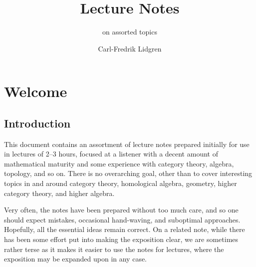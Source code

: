 \documentclass[a4paper, 11pt]{article}
\title{Lecture Notes}
\author{on assorted topics}
\date{Carl-Fredrik Lidgren}
\newcommand{\1}{\ensuremath{\mathbb{1}}}
\newcommand{\2}{\ensuremath{\mathbb{2}}}
\newcommand{\3}{\ensuremath{\mathbb{3}}}
\begin{document}
\maketitle


\tableofcontents

\clearpage
\setcounter{section}{-1}
\section{Welcome}
\subsection{Introduction}
This document contains an assortment of lecture notes prepared initially for use in lectures of 2--3 hours, focused at a listener with a decent amount of mathematical
maturity and some experience with category theory, algebra, topology, and so on. There is no overarching goal, other than to cover interesting topics in and around category
theory, homological algebra, geometry, higher category theory, and higher algebra.

Very often, the notes have been prepared without too much care, and so one should expect mistakes, occasional hand-waving, and suboptimal approaches. Hopefully, all the essential ideas
remain correct. On a related note, while there has been some effort put into making the exposition clear, we are sometimes rather terse as it makes it easier to use the notes
for lectures, where the exposition may be expanded upon in any case.
\end{document}
